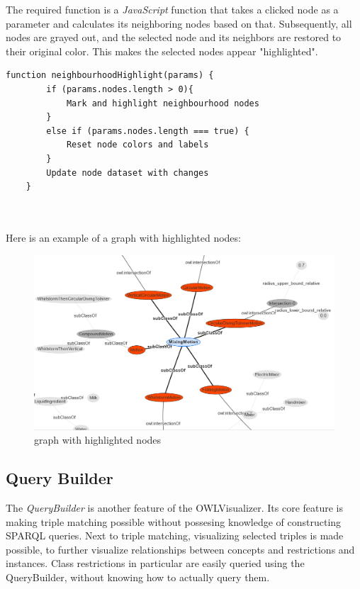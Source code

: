 The required function is a \textit{JavaScript} function that takes a clicked node as a parameter and calculates its neighboring nodes based on that. 
Subsequently, all nodes are grayed out, and the selected node and its neighbors are restored to their original color. This makes the selected nodes appear "highlighted".

\begin{lstlisting}[caption={Neighbourhood highlighting},captionpos=b]
    function neighbourhoodHighlight(params) {
        if (params.nodes.length > 0){
            Mark and highlight neighbourhood nodes
        }
        else if (params.nodes.length === true) {
            Reset node colors and labels
        }
        Update node dataset with changes
    }
        
        
\end{lstlisting}

Here is an example of a graph with highlighted nodes:

\begin{figure}[H]
    \includegraphics[scale=0.3]{Graphics/nodes_highlight_html.png}
    \caption{graph with highlighted nodes}
\end{figure}

\subsection{Query Builder}
The \textit{QueryBuilder} is another feature of the OWLVisualizer. Its core feature is making triple matching possible without possesing knowledge of  
constructing SPARQL queries. Next to triple matching, visualizing selected triples is made possible, to further visualize relationships between concepts and restrictions
and instances. 
Class restrictions in particular are easily queried using the QueryBuilder, without knowing how to actually query them. 

